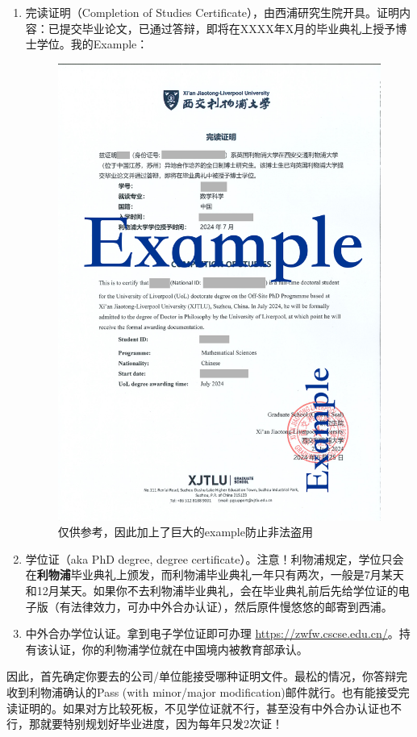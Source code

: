 \begin{enumerate}
    \item 完读证明（Completion of Studies Certificate），由西浦研究生院开具。证明内容：已提交毕业论文，已通过答辩，即将在XXXX年X月的毕业典礼上授予博士学位。我的Example：
    \begin{figure}[H]
        \centering
        \includegraphics[width=0.8\columnwidth]{author-folder/Kai.Wu/Completion_of_Studies_Certificate_EXAMPLE.pdf}
        \caption{仅供参考，因此加上了巨大的example防止非法盗用}
    \end{figure}
    \item 学位证（aka PhD degree, degree certificate）。注意！利物浦规定，学位只会在\textbf{利物浦}毕业典礼上颁发，而利物浦毕业典礼一年只有两次，一般是7月某天和12月某天。如果你不去利物浦毕业典礼，会在毕业典礼前后先给学位证的电子版（有法律效力，可办中外合办认证），然后原件慢悠悠的邮寄到西浦。
    \item 中外合办学位认证。拿到电子学位证即可办理 \url{https://zwfw.cscse.edu.cn/}。持有该认证，你的利物浦学位就在中国境内被教育部承认。
\end{enumerate}

因此，首先确定你要去的公司/单位能接受哪种证明文件。最松的情况，你答辩完收到利物浦确认的Pass (with minor/major modification)邮件就行。也有能接受完读证明的。如果对方比较死板，不见学位证就不行，甚至没有中外合办认证也不行，那就要特别规划好毕业进度，因为每年只发2次证！

